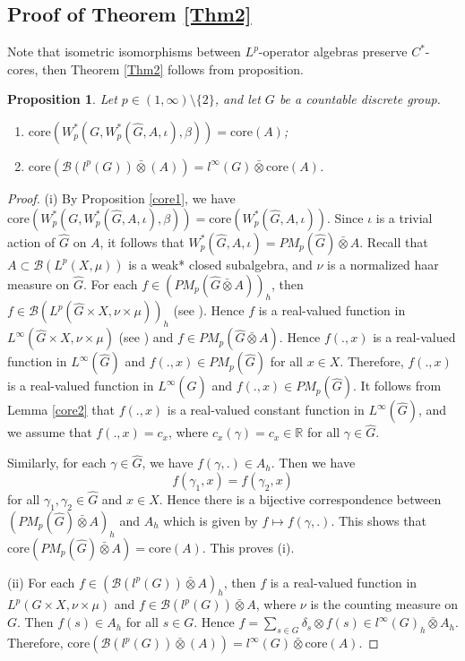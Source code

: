 \documentclass[reqno,11pt]{amsart}
\theoremstyle{plain}
\newtheorem{prop}[thm]{Proposition}
\theoremstyle{definition}
\theoremstyle{remark}
\begin{document}
\subsection{Proof of Theorem \ref{Thm2}}
Note that isometric isomorphisms between $L^p$-operator algebras preserve $C^*$-cores, then Theorem \ref{Thm2} follows from proposition.
\begin{prop}\label{c1}
Let $p\in(1,\infty)\setminus\{2\}$, and let $G$ be a countable discrete group.
\begin{enumerate}
\item[(i)] $\mathrm{core}(W^*_p(G,W^*_p(\hat{G},A,\iota),\beta))=\mathrm{core}(A)$;
\item[(ii)]  $\mathrm{core}(\mathcal{B}(l^p(G))\bar{\otimes}(A))=l^\infty(G)\bar{\otimes}\mathrm{core}(A)$.
\end{enumerate}
\end{prop}
\begin{proof}
(i) By Proposition \ref{core1}, we have $\mathrm{core}(W^*_p(G,W^*_p(\hat{G},A,\iota),\beta))=\mathrm{core}(W^*_p(\hat{G},A,\iota))$.
Since $\iota$ is a trivial action of $\widehat{G}$ on $A$, it follows that $W^*_p(\hat{G},A,\iota)=PM_p(\widehat{G})\bar{\otimes}A$. Recall that $A\subset \mathcal{B}(L^p(X,\mu))$ is a weak* closed subalgebra, and $\nu$ is a normalized haar measure on $\widehat{G}$.
For each $f\in (PM_p(\hat{G}\bar{\otimes}A))_h$, then $f\in \mathcal{B}(L^p(\widehat{G}\times X,\nu\times \mu))_h$ (see \cite[Lemma 2.10]{Blecher and Phillips}).
Hence $f$ is a real-valued function in $L^\infty(\widehat{G}\times X,\nu\times \mu)$ (see \cite[Proposition 2.7]{Choi and}) and $f\in PM_p(\hat{G}\bar{\otimes}A)$. Hence $f(.,x)$ is a real-valued function in $L^\infty(\hat{G})$ and $f(.,x)\in PM_p(\widehat{G})$ for all $x\in X$.
Therefore,  $f(.,x)$ is a real-valued function in $L^\infty(\widehat{G})$ and $f(.,x)\in PM_p(\widehat{G})$.
It follows from Lemma \ref{core2} that $f(.,x)$ is a real-valued constant function in $L^\infty(\widehat{G})$, and we assume that $f(.,x)=c_x$, where $c_x(\gamma)=c_x\in \mathbb{R}$ for all $\gamma\in \widehat{G}$.

Similarly, for each $\gamma\in \widehat{G}$, we have $f(\gamma,.)\in A_h$. Then we have $$f(\gamma_1,x)=f(\gamma_2,x)$$ for all $\gamma_1,\gamma_2\in \widehat{G}$ and $x\in X$. Hence there is a bijective correspondence between $(PM_p(\hat{G})\bar{\otimes}A)_h$ and $A_h$ which is given by $f\mapsto f(\gamma,.)$. This shows that $\mathrm{core}(PM_p(\widehat{G})\bar{\otimes}A)=\mathrm{core}(A)$. This proves (i).

(ii) For each $f\in (\mathcal{B}(l^p(G))\bar{\otimes}A)_h$, then $f$ is a real-valued function in $L^p(G\times X,\nu\times\mu)$ and $f\in \mathcal{B}(l^p(G))\bar{\otimes}A$, where $\nu$ is the counting measure on $G$. Then $f(s)\in A_h$ for all $s\in G$. Hence $f=\sum_{s\in G}\delta_s\otimes f(s)\in l^\infty(G)_h\bar{\otimes} A_h$. Therefore,  $\mathrm{core}(\mathcal{B}(l^p(G))\bar{\otimes}(A))=l^\infty(G)\bar{\otimes}\mathrm{core}(A)$.
\end{proof}
\end{document}
